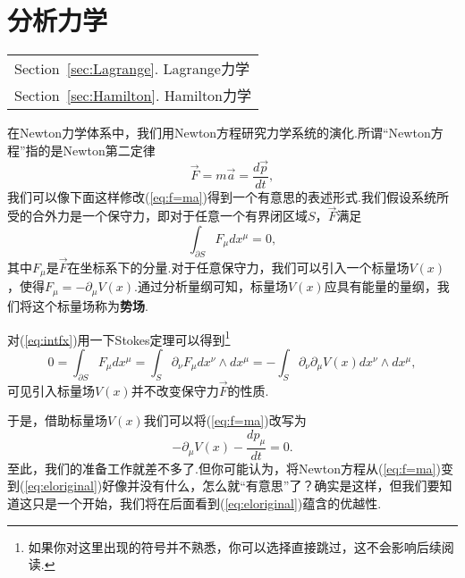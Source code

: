 \part{分析力学}\label{Part:Analytical}
	\begin{margintable}\vspace{1.4in}\footnotesize
		\begin{tabularx}{\marginparwidth}{|X}
			Section~\ref{sec:Lagrange}. Lagrange力学\\
			Section~\ref{sec:Hamilton}. Hamilton力学\\
		\end{tabularx}
	\end{margintable}

	在Newton力学体系中，我们用Newton方程研究力学系统的演化.所谓“Newton方程”指的是Newton第二定律
	\begin{equation}\label{eq:f=ma}
		\overrightarrow{F} =m\overrightarrow{a}=\frac{d\overrightarrow{p}}{dt},
	\end{equation}
	我们可以像下面这样修改(\ref{eq:f=ma})得到一个有意思的表述形式.我们假设系统所受的合外力是一个保守力，即对于任意一个有界闭区域$S$，$\overrightarrow{F}$满足
	\begin{equation}\label{eq:intfx}
		\int _{\partial S}F_\mu dx^\mu=0,
	\end{equation}
	其中$F_\mu$是$\overrightarrow{F}$在坐标系下的分量.对于任意保守力，我们可以引入一个标量场$V(x)$，使得$F_\mu=-\partial_\mu V(x)$.通过分析量纲可知，标量场$V(x)$应具有能量的量纲，我们将这个标量场称为\textbf{势场}.
	\begin{remark}
		对(\ref{eq:intfx})用一下Stokes定理可以得到\footnote{如果你对这里出现的符号并不熟悉，你可以选择直接跳过，这不会影响后续阅读.}
		$$0=\int_{\partial S}F_\mu dx^\mu=\int_S \partial_\nu F_\mu dx^\nu\wedge dx^\mu=-\int_S\partial_\nu \partial_\mu V(x) dx^\nu\wedge dx^\mu,$$
		可见引入标量场$V(x)$并不改变保守力$\overrightarrow{F}$的性质.
	\end{remark}
	于是，借助标量场$V(x)$我们可以将(\ref{eq:f=ma})改写为
	\begin{equation}\label{eq:eloriginal}
		-\partial_\mu V(x)-\frac{dp_\mu}{dt}=0.
	\end{equation}
	至此，我们的准备工作就差不多了.但你可能认为，将Newton方程从(\ref{eq:f=ma})变到(\ref{eq:eloriginal})好像并没有什么，怎么就“有意思”了？确实是这样，但我们要知道这只是一个开始，我们将在后面看到(\ref{eq:eloriginal})蕴含的优越性.
